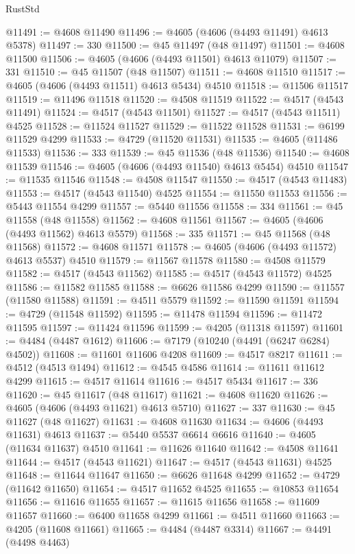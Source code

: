 \begin{lexlean}{RustStd}
\begin{coremodule}
@11491 := @4608 @11490
@11496 := @4605 (@4606 (@4493 @11491) @4613 @5378)
@11497 := 330
@11500 := @45 @11497 (@48 @11497)
@11501 := @4608 @11500
@11506 := @4605 (@4606 (@4493 @11501) @4613 @11079)
@11507 := 331
@11510 := @45 @11507 (@48 @11507)
@11511 := @4608 @11510
@11517 := @4605 (@4606 (@4493 @11511) @4613 @5434) @4510
@11518 := @11506 @11517
@11519 := @11496 @11518
@11520 := @4508 @11519
@11522 := @4517 (@4543 @11491)
@11524 := @4517 (@4543 @11501)
@11527 := @4517 (@4543 @11511) @4525
@11528 := @11524 @11527
@11529 := @11522 @11528
@11531 := @6199 @11529 @4299
@11533 := @4729 (@11520 @11531)
@11535 := @4605 (@11486 @11533)
@11536 := 333
@11539 := @45 @11536 (@48 @11536)
@11540 := @4608 @11539
@11546 := @4605 (@4606 (@4493 @11540) @4613 @5454) @4510
@11547 := @11535 @11546
@11548 := @4508 @11547
@11550 := @4517 (@4543 @11483)
@11553 := @4517 (@4543 @11540) @4525
@11554 := @11550 @11553
@11556 := @5443 @11554 @4299
@11557 := @5440 @11556
@11558 := 334
@11561 := @45 @11558 (@48 @11558)
@11562 := @4608 @11561
@11567 := @4605 (@4606 (@4493 @11562) @4613 @5579)
@11568 := 335
@11571 := @45 @11568 (@48 @11568)
@11572 := @4608 @11571
@11578 := @4605 (@4606 (@4493 @11572) @4613 @5537) @4510
@11579 := @11567 @11578
@11580 := @4508 @11579
@11582 := @4517 (@4543 @11562)
@11585 := @4517 (@4543 @11572) @4525
@11586 := @11582 @11585
@11588 := @6626 @11586 @4299
@11590 := @11557 (@11580 @11588)
@11591 := @4511 @5579
@11592 := @11590 @11591
@11594 := @4729 (@11548 @11592)
@11595 := @11478 @11594
@11596 := @11472 @11595
@11597 := @11424 @11596
@11599 := @4205 (@11318 @11597)
@11601 := @4484 (@4487 @1612)
@11606 := @7179 (@10240 (@4491 (@6247 @6284) @4502))
@11608 := @11601 @11606 @4208
@11609 := @4517 @8217
@11611 := @4512 (@4513 @1494)
@11612 := @4545 @4586
@11614 := @11611 @11612 @4299
@11615 := @4517 @11614
@11616 := @4517 @5434
@11617 := 336
@11620 := @45 @11617 (@48 @11617)
@11621 := @4608 @11620
@11626 := @4605 (@4606 (@4493 @11621) @4613 @5710)
@11627 := 337
@11630 := @45 @11627 (@48 @11627)
@11631 := @4608 @11630
@11634 := @4606 (@4493 @11631) @4613
@11637 := @5440 @5537 @6614 @6616
@11640 := @4605 (@11634 @11637) @4510
@11641 := @11626 @11640
@11642 := @4508 @11641
@11644 := @4517 (@4543 @11621)
@11647 := @4517 (@4543 @11631) @4525
@11648 := @11644 @11647
@11650 := @6626 @11648 @4299
@11652 := @4729 (@11642 @11650)
@11654 := @4517 @11652 @4525
@11655 := @10853 @11654
@11656 := @11616 @11655
@11657 := @11615 @11656
@11658 := @11609 @11657
@11660 := @6400 @11658 @4299
@11661 := @4511 @11660
@11663 := @4205 (@11608 @11661)
@11665 := @4484 (@4487 @3314)
@11667 := @4491 (@4498 @4463)

\end{coremodule}
\end{lexlean}
